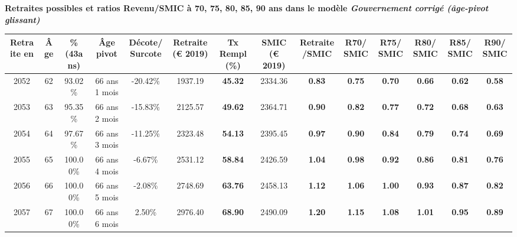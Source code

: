  \vspace{0.1cm} 
{\bf \noindent Retraites possibles et ratios Revenu/SMIC à 70, 75, 80, 85, 90 ans dans le modèle \emph{Gouvernement corrigé (âge-pivot glissant)}}  
 
\begin{adjustbox}{max width=\textwidth} 
\begin{tabular}[htb]{|c|c||c|c|c||c|c||c|c||c|c|c|c|c|} 
\hline 
 Retraite en &  Âge &  \%(43ans) &  Âge pivot &  Décote/Surcote &  Retraite (\euro{} 2019) &  Tx Rempl(\%) &  SMIC (\euro{} 2019) &  Retraite/SMIC &  R70/SMIC &  R75/SMIC &  R80/SMIC &  R85/SMIC &  R90/SMIC \\ 
\hline \hline 
 2052 &  62 &  93.02\% &  66 ans 1 mois &  -20.42\% &  1937.19 &  {\bf 45.32} &  2334.36 &  {\bf {\color{red} 0.83}} &  {\bf {\color{red} 0.75}} &  {\bf {\color{red} 0.70}} &  {\bf {\color{red} 0.66}} &  {\bf {\color{red} 0.62}} &  {\bf {\color{red} 0.58}} \\ 
\hline 
 2053 &  63 &  95.35\% &  66 ans 2 mois &  -15.83\% &  2125.57 &  {\bf 49.62} &  2364.71 &  {\bf {\color{red} 0.90}} &  {\bf {\color{red} 0.82}} &  {\bf {\color{red} 0.77}} &  {\bf {\color{red} 0.72}} &  {\bf {\color{red} 0.68}} &  {\bf {\color{red} 0.63}} \\ 
\hline 
 2054 &  64 &  97.67\% &  66 ans 3 mois &  -11.25\% &  2323.48 &  {\bf 54.13} &  2395.45 &  {\bf {\color{red} 0.97}} &  {\bf {\color{red} 0.90}} &  {\bf {\color{red} 0.84}} &  {\bf {\color{red} 0.79}} &  {\bf {\color{red} 0.74}} &  {\bf {\color{red} 0.69}} \\ 
\hline 
 2055 &  65 &  100.00\% &  66 ans 4 mois &  -6.67\% &  2531.12 &  {\bf 58.84} &  2426.59 &  {\bf 1.04} &  {\bf {\color{red} 0.98}} &  {\bf {\color{red} 0.92}} &  {\bf {\color{red} 0.86}} &  {\bf {\color{red} 0.81}} &  {\bf {\color{red} 0.76}} \\ 
\hline 
 2056 &  66 &  100.00\% &  66 ans 5 mois &  -2.08\% &  2748.69 &  {\bf 63.76} &  2458.13 &  {\bf 1.12} &  {\bf 1.06} &  {\bf {\color{red} 1.00}} &  {\bf {\color{red} 0.93}} &  {\bf {\color{red} 0.87}} &  {\bf {\color{red} 0.82}} \\ 
\hline 
 2057 &  67 &  100.00\% &  66 ans 6 mois &  2.50\% &  2976.40 &  {\bf 68.90} &  2490.09 &  {\bf 1.20} &  {\bf 1.15} &  {\bf 1.08} &  {\bf 1.01} &  {\bf {\color{red} 0.95}} &  {\bf {\color{red} 0.89}} \\ 
\hline 
\hline 
\end{tabular} 
\end{adjustbox} 
 
